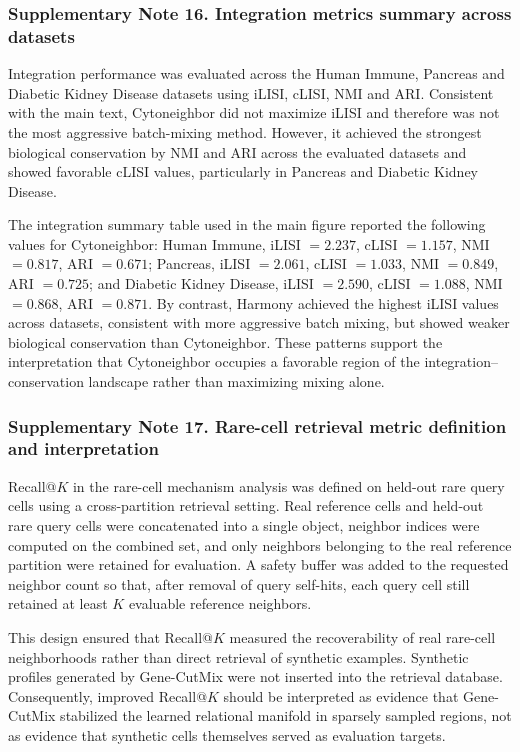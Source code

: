\documentclass[11pt]{article}
\begin{document}
\subsubsection*{Supplementary Note 16. Integration metrics summary across datasets}

Integration performance was evaluated across the Human Immune, Pancreas and Diabetic Kidney Disease datasets using iLISI, cLISI, NMI and ARI. Consistent with the main text, Cytoneighbor did not maximize iLISI and therefore was not the most aggressive batch-mixing method. However, it achieved the strongest biological conservation by NMI and ARI across the evaluated datasets and showed favorable cLISI values, particularly in Pancreas and Diabetic Kidney Disease.

The integration summary table used in the main figure reported the following values for Cytoneighbor: Human Immune, iLISI $= 2.237$, cLISI $= 1.157$, NMI $= 0.817$, ARI $= 0.671$; Pancreas, iLISI $= 2.061$, cLISI $= 1.033$, NMI $= 0.849$, ARI $= 0.725$; and Diabetic Kidney Disease, iLISI $= 2.590$, cLISI $= 1.088$, NMI $= 0.868$, ARI $= 0.871$. By contrast, Harmony achieved the highest iLISI values across datasets, consistent with more aggressive batch mixing, but showed weaker biological conservation than Cytoneighbor. These patterns support the interpretation that Cytoneighbor occupies a favorable region of the integration--conservation landscape rather than maximizing mixing alone.

\subsubsection*{Supplementary Note 17. Rare-cell retrieval metric definition and interpretation}

Recall@$K$ in the rare-cell mechanism analysis was defined on held-out rare query cells using a cross-partition retrieval setting. Real reference cells and held-out rare query cells were concatenated into a single object, neighbor indices were computed on the combined set, and only neighbors belonging to the real reference partition were retained for evaluation. A safety buffer was added to the requested neighbor count so that, after removal of query self-hits, each query cell still retained at least $K$ evaluable reference neighbors.

This design ensured that Recall@$K$ measured the recoverability of real rare-cell neighborhoods rather than direct retrieval of synthetic examples. Synthetic profiles generated by Gene-CutMix were not inserted into the retrieval database. Consequently, improved Recall@$K$ should be interpreted as evidence that Gene-CutMix stabilized the learned relational manifold in sparsely sampled regions, not as evidence that synthetic cells themselves served as evaluation targets.
\end{document}
